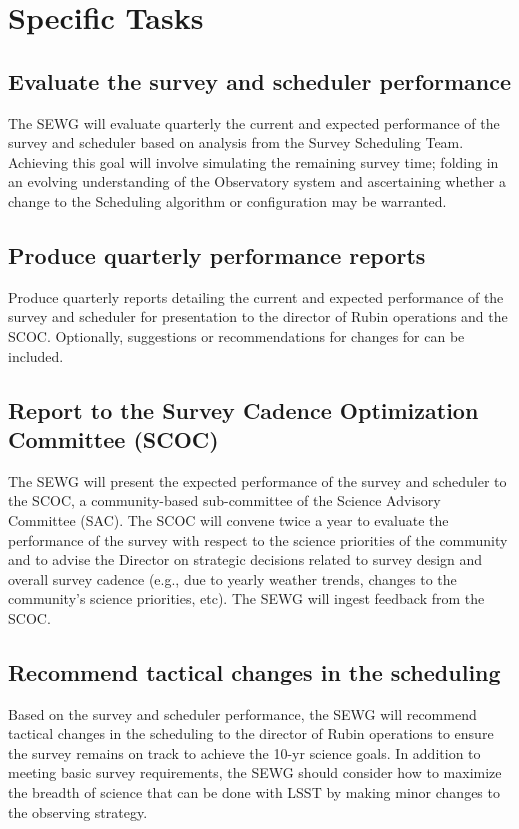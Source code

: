 \documentclass[DM,authoryear,toc]{lsstdoc}
\begin{document}
 
\section{Specific Tasks}

\subsection{Evaluate the survey and scheduler performance}
The SEWG will evaluate quarterly the current and expected performance of the survey and scheduler based on analysis from the Survey Scheduling Team.
Achieving this goal will involve simulating the remaining survey time; folding in an evolving understanding of the Observatory system and ascertaining whether a change to the Scheduling algorithm or configuration may be warranted. 

\subsection{Produce quarterly performance reports}
Produce quarterly reports detailing the current and expected performance of the survey and scheduler for presentation to the director of Rubin operations and the SCOC. 
Optionally, suggestions or recommendations for changes for can be included. 

\subsection{Report to the Survey Cadence Optimization Committee (SCOC)}
The SEWG will present the expected performance of the survey and scheduler to the SCOC,  a community-based sub-committee of the Science Advisory Committee (SAC). 
The SCOC will convene twice a year to evaluate the performance of the survey with respect to the science priorities of the community and to advise the Director on strategic decisions related to survey design and overall survey cadence (e.g., due to  yearly weather trends, changes to the community's science priorities, etc).
The SEWG will ingest feedback from the SCOC.


\subsection{Recommend tactical changes in the scheduling}
Based on the  survey and scheduler performance, the SEWG will recommend tactical changes in the scheduling to the director of Rubin operations to ensure the survey remains on track to achieve the 10-yr science goals.
In addition to meeting basic survey requirements, the SEWG should consider how to maximize the breadth of science that can be done with LSST by making minor changes to the observing strategy. 
\end{document}
